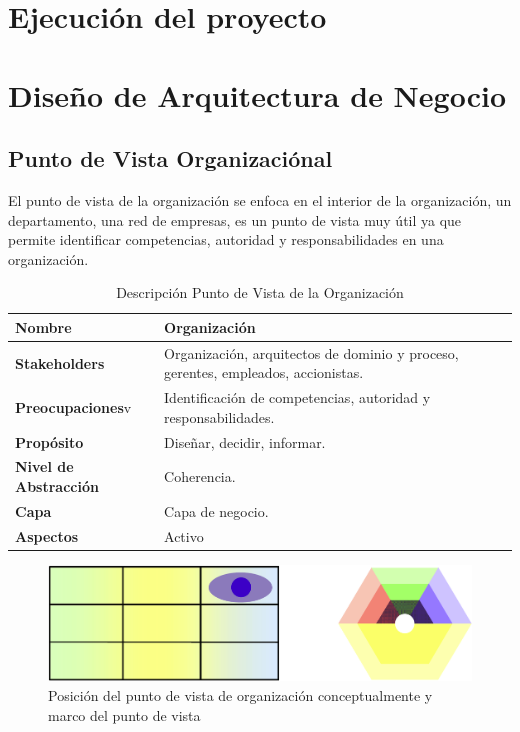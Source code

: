 \section{Ejecución del proyecto}
    \section{Diseño de Arquitectura de Negocio}
      \subsection{Punto de Vista Organizaciónal}
      El punto de vista de la organización se enfoca en el interior de la organización, un departamento, una red de empresas, es un punto de vista muy útil ya que permite identificar  competencias, autoridad y responsabilidades en una organización. \cite{ref9}
  \begin{table}[h]
	\centering
	\begin{tabular}{p{3.7cm}p{8cm}}
		\hline
        \textbf{Nombre} & \textbf{Organización} \\
		\hline
		\textbf{Stakeholders} & Organización, arquitectos de dominio y proceso, gerentes, empleados, accionistas.\\
		\textbf{Preocupaciones}v & Identificación de competencias, autoridad y responsabilidades.\\
		\textbf{Propósito} & Diseñar, decidir, informar. \\
		\textbf{Nivel de Abstracción} & Coherencia. \\
		\textbf{Capa} & Capa de negocio. \\
		\textbf{Aspectos} & Activo \\
	\end{tabular}
	\caption{Descripción Punto de Vista de la Organización \cite{ref9}}
	\label{tabla4}
  \end{table}
  \begin{figure}[h]
 	\centering
 	\includegraphics[scale=0.2]{Imagenes/Figuras/14.png}
 	\caption{Posición del punto de vista de organización conceptualmente y marco del punto de vista \cite{ref9}}
 	\label{figura14}
  \end{figure}
